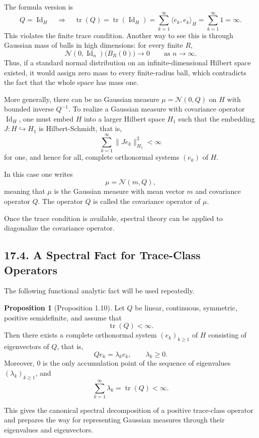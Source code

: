 \documentclass[11pt]{article}
\theoremstyle{definition}
\newtheorem{proposition}{Proposition}
\theoremstyle{remark}
\begin{document}
The formula version is
\[
Q
=
\operatorname{Id}_H
\quad\Longrightarrow\quad
\operatorname{tr}(Q)
=
\operatorname{tr}(\operatorname{Id}_H)
=
\sum_{k=1}^{\infty}\langle e_k,e_k\rangle_H
=
\sum_{k=1}^{\infty}1
=
\infty.
\]
This violates the finite trace condition.
Another way to see this is through Gaussian mass of balls in high dimensions: for every finite $R$,
\[
\mathcal N(0,\operatorname{Id}_n)\bigl(B_R(0)\bigr)\to 0
\qquad \text{as } n\to\infty.
\]
Thus, if a standard normal distribution on an infinite-dimensional Hilbert space existed, it would assign zero mass to every finite-radius ball, which contradicts the fact that the whole space has mass one.

More generally, there can be no Gaussian measure $\mu=\mathcal N(0,Q)$ on $H$ with bounded inverse $Q^{-1}$. To realize a Gaussian measure with covariance operator $\operatorname{Id}_H$, one must embed $H$ into a larger Hilbert space $H_1$ such that the embedding
\(J:H\hookrightarrow H_1\) is Hilbert-Schmidt, that is,
\[
\sum_{k=1}^{\infty}\|Je_k\|_{H_1}^2<\infty
\]
for one, and hence for all, complete orthonormal systems $(e_k)$ of $H$.

In this case one writes
\[
\mu=\mathcal N(m,Q),
\]
meaning that $\mu$ is the Gaussian measure with mean vector $m$ and covariance operator $Q$. The operator $Q$ is called the covariance operator of $\mu$.

Once the trace condition is available, spectral theory can be applied to diagonalize the covariance operator.

\subsection*{17.4. A Spectral Fact for Trace-Class Operators}
The following functional analytic fact will be used repeatedly.

\begin{proposition}[Proposition 1.10]
Let $Q$ be linear, continuous, symmetric, positive semidefinite, and assume that
\[
\operatorname{tr}(Q)<\infty.
\]
Then there exists a complete orthonormal system $(e_k)_{k\ge 1}$ of $H$ consisting of eigenvectors of $Q$, that is,
\[
Qe_k=\lambda_k e_k,
\qquad
\lambda_k\ge 0.
\]
Moreover, $0$ is the only accumulation point of the sequence of eigenvalues $(\lambda_k)_{k\ge 1}$, and
\[
\sum_{k=1}^{\infty}\lambda_k=\operatorname{tr}(Q)<\infty.
\]
\end{proposition}

This gives the canonical spectral decomposition of a positive trace-class operator and prepares the way for representing Gaussian measures through their eigenvalues and eigenvectors.
\end{document}
